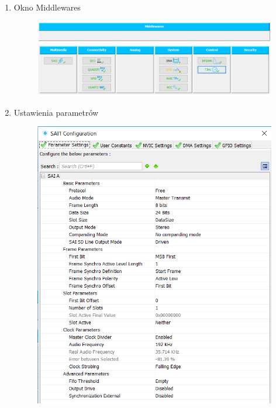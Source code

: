 \documentclass[10pt, a4paper]{article}
\begin{document}
\begin{enumerate}
				\item Okno Middlewares
	\begin{figure}[H]
	\centering
	\includegraphics[width=\linewidth]{conf9.png}
	\end{figure}
	\newpage
					\item Ustawienia parametrów
	\begin{figure}[H]
	\centering
	\includegraphics[width=\linewidth]{conf3.png}
	\end{figure}
		\begin{figure}[H]
	\centering

\end{figure}
\end{enumerate}
\end{document}
